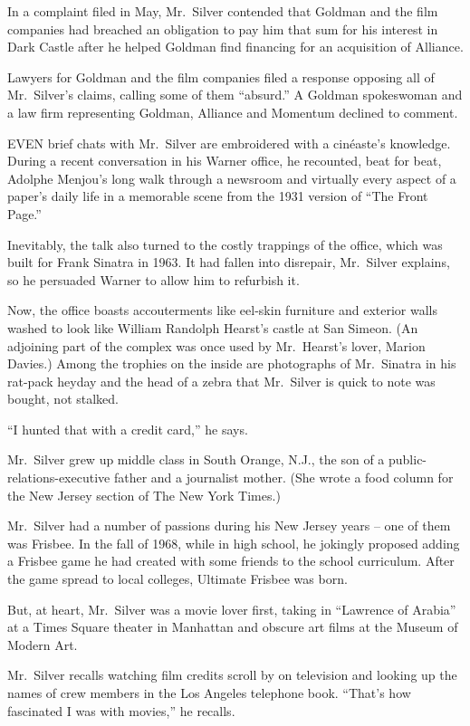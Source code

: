 ﻿\documentclass[12pt]{article}
\begin{document}
In a complaint filed in May, Mr.~Silver contended that Goldman and the film companies had breached
an obligation to pay him that sum for his interest in Dark Castle after he helped Goldman find
financing for an acquisition of Alliance.

Lawyers for Goldman and the film companies filed a response opposing all of Mr.~Silver's claims,
calling some of them ``absurd.'' A Goldman spokeswoman and a law firm representing Goldman, Alliance
and Momentum declined to comment.

EVEN brief chats with Mr.~Silver are embroidered with a cin\'easte's knowledge. During a recent
conversation in his Warner office, he recounted, beat for beat, Adolphe Menjou's long walk through a
newsroom and virtually every aspect of a paper's daily life in a memorable scene from the 1931
version of ``The Front Page.''

Inevitably, the talk also turned to the costly trappings of the office, which was built for Frank
Sinatra in 1963. It had fallen into disrepair, Mr.~Silver explains, so he persuaded Warner to allow
him to refurbish it.

Now, the office boasts accouterments like eel-skin furniture and exterior walls washed to look like
William Randolph Hearst's castle at San Simeon. (An adjoining part of the complex was once used by
Mr.~Hearst's lover, Marion Davies.) Among the trophies on the inside are photographs of Mr.~Sinatra
in his rat-pack heyday and the head of a zebra that Mr.~Silver is quick to note was bought, not
stalked.

``I hunted that with a credit card,'' he says.

Mr.~Silver grew up middle class in South Orange, N.J., the son of a public-relations-executive
father and a journalist mother. (She wrote a food column for the New Jersey section of The New York
Times.)

Mr.~Silver had a number of passions during his New Jersey years -- one of them was Frisbee. In the
fall of 1968, while in high school, he jokingly proposed adding a Frisbee game he had created with
some friends to the school curriculum. After the game spread to local colleges, Ultimate Frisbee was
born.

But, at heart, Mr.~Silver was a movie lover first, taking in ``Lawrence of Arabia'' at a Times
Square theater in Manhattan and obscure art films at the Museum of Modern Art.

Mr.~Silver recalls watching film credits scroll by on television and looking up the names of crew
members in the Los Angeles telephone book. ``That's how fascinated I was with movies,'' he recalls.
\end{document}
